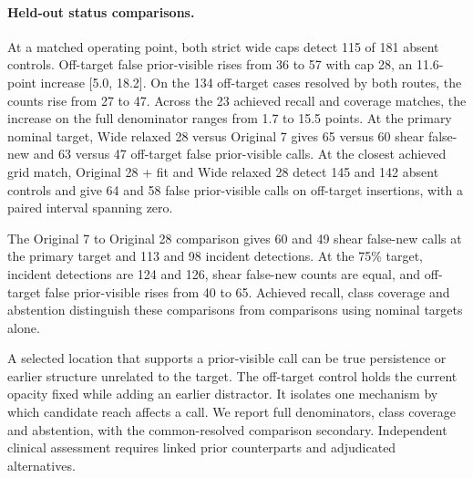 \paragraph{Held-out status comparisons.}
At a matched operating point, both strict wide caps detect 115 of 181 absent controls. Off-target false prior-visible rises from 36 to 57 with cap 28, an 11.6-point increase [5.0, 18.2]. On the 134 off-target cases resolved by both routes, the counts rise from 27 to 47. Across the 23 achieved recall and coverage matches, the increase on the full denominator ranges from 1.7 to 15.5 points. At the primary nominal target, Wide relaxed 28 versus Original 7 gives 65 versus 60 shear false-new and 63 versus 47 off-target false prior-visible calls. At the closest achieved grid match, Original 28 + fit and Wide relaxed 28 detect 145 and 142 absent controls and give 64 and 58 false prior-visible calls on off-target insertions, with a paired interval spanning zero.

The Original 7 to Original 28 comparison gives 60 and 49 shear false-new calls at the primary target and 113 and 98 incident detections. At the 75\% target, incident detections are 124 and 126, shear false-new counts are equal, and off-target false prior-visible rises from 40 to 65. Achieved recall, class coverage and abstention distinguish these comparisons from comparisons using nominal targets alone.

A selected location that supports a prior-visible call can be true persistence or earlier structure unrelated to the target. The off-target control holds the current opacity fixed while adding an earlier distractor. It isolates one mechanism by which candidate reach affects a call. We report full denominators, class coverage and abstention, with the common-resolved comparison secondary. Independent clinical assessment requires linked prior counterparts and adjudicated alternatives.
